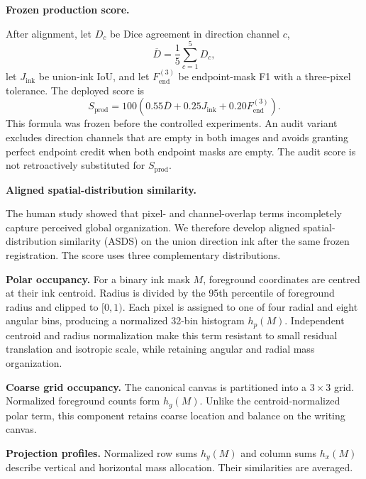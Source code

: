 \medskip
\noindent\textbf{Frozen production score.}
\label{sec:production-score}

After alignment, let \(D_c\) be Dice agreement in direction channel \(c\),
\[
\overline{D}=\frac{1}{5}\sum_{c=1}^{5}D_c,
\]
let \(J_{\mathrm{ink}}\) be union-ink IoU, and let
\(F_{\mathrm{end}}^{(3)}\) be endpoint-mask F1 with a three-pixel tolerance.
The deployed score is
\[
S_{\mathrm{prod}}
=100\left(
0.55\overline{D}
+0.25J_{\mathrm{ink}}
+0.20F_{\mathrm{end}}^{(3)}
\right).
\]
This formula was frozen before the controlled experiments. An audit variant
excludes direction channels that are empty in both images and avoids granting
perfect endpoint credit when both endpoint masks are empty. The audit score is
not retroactively substituted for \(S_{\mathrm{prod}}\).

\medskip
\noindent\textbf{Aligned spatial-distribution similarity.}
\label{sec:asds}

The human study showed that pixel- and channel-overlap terms incompletely
capture perceived global organization. We therefore develop aligned
spatial-distribution similarity (ASDS) on the union direction ink after the
same frozen registration. The score uses three complementary distributions.

\noindent\textbf{Polar occupancy.}
For a binary ink mask \(M\), foreground coordinates are centred at their ink
centroid. Radius is divided by the 95th percentile of foreground radius and
clipped to \([0,1)\). Each pixel is assigned to one of four radial and eight
angular bins, producing a normalized 32-bin histogram \(h_p(M)\). Independent
centroid and radius normalization make this term resistant to small residual
translation and isotropic scale, while retaining angular and radial mass
organization.

\noindent\textbf{Coarse grid occupancy.}
The canonical canvas is partitioned into a \(3\times3\) grid. Normalized
foreground counts form \(h_g(M)\). Unlike the centroid-normalized polar term,
this component retains coarse location and balance on the writing canvas.

\noindent\textbf{Projection profiles.}
Normalized row sums \(h_y(M)\) and column sums \(h_x(M)\) describe vertical and
horizontal mass allocation. Their similarities are averaged.

